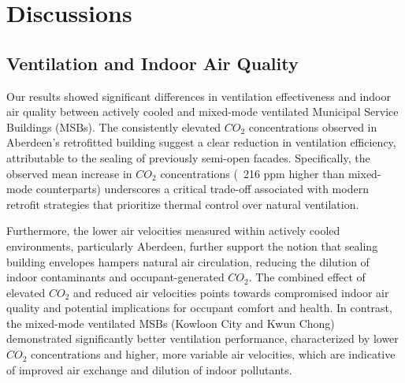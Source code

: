 \documentclass[preprint,12pt]{elsarticle}
\begin{document}

\section{Discussions}
\subsection{Ventilation and Indoor Air Quality}
Our results showed significant differences in ventilation effectiveness and indoor air quality between actively cooled and mixed-mode ventilated Municipal Service Buildings (MSBs). The consistently elevated $CO_2$ concentrations observed in Aberdeen’s retrofitted building suggest a clear reduction in ventilation efficiency, attributable to the sealing of previously semi-open facades. Specifically, the observed mean increase in $CO_2$ concentrations (~216 ppm higher than mixed-mode counterparts) underscores a critical trade-off associated with modern retrofit strategies that prioritize thermal control over natural ventilation.

Furthermore, the lower air velocities measured within actively cooled environments, particularly Aberdeen, further support the notion that sealing building envelopes hampers natural air circulation, reducing the dilution of indoor contaminants and occupant-generated $CO_2$. The combined effect of elevated $CO_2$ and reduced air velocities points towards compromised indoor air quality and potential implications for occupant comfort and health. In contrast, the mixed-mode ventilated MSBs (Kowloon City and Kwun Chong) demonstrated significantly better ventilation performance, characterized by lower $CO_2$ concentrations and higher, more variable air velocities, which are indicative of improved air exchange and dilution of indoor pollutants.
\end{document}
